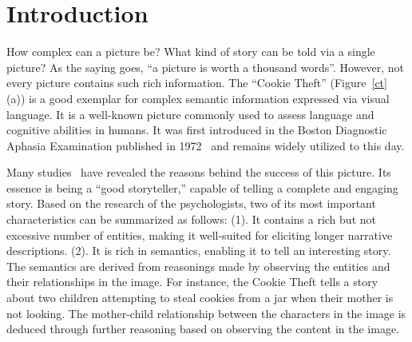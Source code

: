 \section{Introduction}

How complex can a picture be?
What kind of story can be told via a single picture? 
As the saying goes, ``a picture is worth a thousand words''. 
However, not every picture contains such rich information.
The ``Cookie Theft'' (Figure~\ref{ct} (a)) is a good exemplar for complex semantic information expressed via visual language. 
It is a well-known picture commonly used to assess language and cognitive abilities in humans. 
It was first introduced in the Boston Diagnostic Aphasia Examination published in 1972~\cite{goodglass2001-ej} and remains widely utilized to this day.

Many studies~\cite{cummings2019describing, tasnim-etal-2022-depac} have revealed the reasons behind the success of this picture.
Its essence is being a ``good storyteller,'' capable of telling a complete and engaging story. 
Based on the research of the psychologists, two of its most important characteristics can be summarized as follows: 
(1). It contains a rich but not excessive number of entities, making it well-suited for eliciting longer narrative descriptions. 
(2). It is rich in semantics, enabling it to tell an interesting story.
The semantics are derived from reasonings made by observing the entities and their relationships in the image.
For instance, the Cookie Theft tells a story about two children attempting to steal cookies from a jar when their mother is not looking. 
The mother-child relationship between the characters in the image is deduced through further reasoning based on observing the content in the image.


